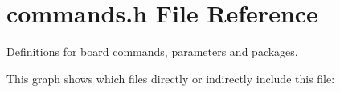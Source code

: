 \section{commands.\+h File Reference}
\label{commands_8h}


Definitions for board commands, parameters and packages.  


This graph shows which files directly or indirectly include this file\+:
